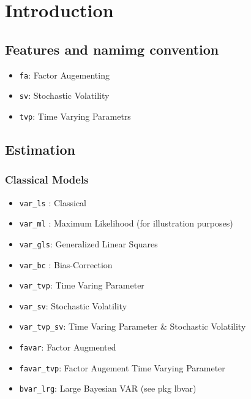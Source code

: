 \documentclass[
]{article}
\author{}
\date{\vspace{-2.5em}}
\providecommand{\tightlist}{%
  \setlength{\itemsep}{0pt}\setlength{\parskip}{0pt}}
\begin{document}
{
\setcounter{tocdepth}{2}
\tableofcontents
}
\hypertarget{intro}{%
\section{Introduction}\label{intro}}

\hypertarget{features-and-namimg-convention}{%
\subsection{Features and namimg convention}\label{features-and-namimg-convention}}

\begin{itemize}
\tightlist
\item
  \texttt{fa}: Factor Augementing
\item
  \texttt{sv}: Stochastic Volatility
\item
  \texttt{tvp}: Time Varying Parametrs
\end{itemize}

\hypertarget{estimation}{%
\subsection{Estimation}\label{estimation}}

\hypertarget{classical-models}{%
\subsubsection{Classical Models}\label{classical-models}}

\begin{itemize}
\item
  \texttt{var\_ls} : Classical
\item
  \texttt{var\_ml} : Maximum Likelihood (for illustration purposes)
\item
  \texttt{var\_gls}: Generalized Linear Squares
\item
  \texttt{var\_bc} : Bias-Correction
\item
  \texttt{var\_tvp}: Time Varing Parameter
\item
  \texttt{var\_sv}: Stochastic Volatility
\item
  \texttt{var\_tvp\_sv}: Time Varing Parameter \& Stochastic Volatility
\item
  \texttt{favar}: Factor Augmented
\item
  \texttt{favar\_tvp}: Factor Augement Time Varying Parameter
\item
  \texttt{bvar\_lrg}: Large Bayesian VAR (see pkg lbvar)
\end{itemize}
\end{document}
